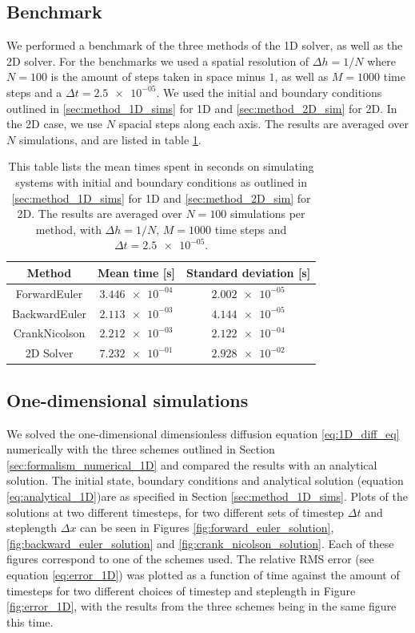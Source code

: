 \documentclass[reprint,english,notitlepage]{revtex4-1}  %
\begin{document}
\subsection{Benchmark} \label{sec:results_benchmark}
We performed a benchmark of the three methods of the 1D solver, as well as the 2D solver. For the benchmarks we used a spatial resolution of \(\Delta h = 1/N\) where \(N = 100\) is the amount of steps taken in space minus \(1\), as well as \(M = 1000\) time steps and a \(\Delta t = \num{2.5e-05}\). We used the initial and boundary conditions outlined in \ref{sec:method_1D_sims} for 1D and \ref{sec:method_2D_sim} for 2D. In the 2D case, we use \(N\) spacial steps along each axis. The results are averaged over \(N\) simulations, and are listed in table \ref{table:benchmark}.

\begin{table}[H]
\centering
\caption{This table lists the mean times spent in seconds on simulating systems with initial and boundary conditions as outlined in \ref{sec:method_1D_sims} for 1D and \ref{sec:method_2D_sim} for 2D. The results are averaged over \(N = 100\) simulations per method, with \(\Delta h = 1/N\), \(M = 1000\) time steps and \(\Delta t = \num{2.5e-05}\).} \label{table:benchmark}
\begin{tabular}{|c|c|c|}
\hline
Method & Mean time [s] & Standard deviation [s]\\\hline
ForwardEuler & \(\num{3.446e-04}\) & \(\num{2.002e-05}\) \\
BackwardEuler & \(\num{2.113e-03}\) & \(\num{4.144e-05}\) \\
CrankNicolson & \(\num{2.212e-03}\) & \(\num{2.122e-04}\) \\
2D Solver & \(\num{7.232e-01}\) & \(\num{2.928e-02}\) \\\hline
\end{tabular}
\end{table}

\subsection{One-dimensional simulations} \label{sec:results_1D}

We solved the one-dimensional dimensionless diffusion equation \eqref{eq:1D_diff_eq} numerically with the three schemes outlined in Section \ref{sec:formalism_numerical_1D} and compared the results with an analytical solution. The initial state, boundary conditions and analytical solution (equation \eqref{eq:analytical_1D})are as specified in Section \ref{sec:method_1D_sims}. Plots of the solutions at two different timesteps, for two different sets of timestep $\Delta t$ and steplength $\Delta x$ can be seen in Figures \ref{fig:forward_euler_solution}, \ref{fig:backward_euler_solution} and \ref{fig:crank_nicolson_solution}. Each of these figures correspond to one of the schemes used. The relative RMS error (see equation \eqref{eq:error_1D}) was plotted as a function of time against the amount of timesteps for two different choices of timestep and steplength in Figure \ref{fig:error_1D}, with the results from the three schemes being in the same figure this time. 
\end{document}
